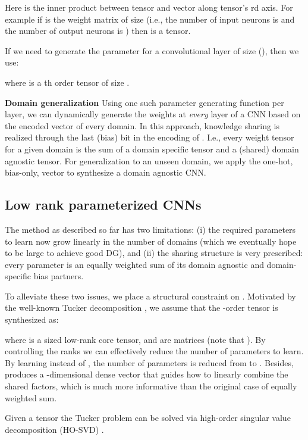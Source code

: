 \documentclass[10pt,twocolumn,letterpaper]{article}
\begin{document}
\noindent Here  is the inner product between tensor and vector along tensor's rd axis. For example if  is the weight matrix of size  (i.e., the number of input neurons is  and the number of output neurons is ) then  is a  tensor.

If we need to generate the parameter for a convolutional layer of size  (), then we use:

\noindent where  is a th order tensor of size .

\vspace{0.1cm}\noindent\textbf{Domain generalization}\quad
Using one such parameter generating function per layer, we can dynamically generate the weights at \emph{every} layer of a CNN based on the encoded vector of every domain. In this approach, knowledge sharing is realized through the last (bias) bit in the encoding of . I.e., every weight tensor for a given domain is the sum of a domain specific tensor and a (shared) domain agnostic tensor. For generalization to an unseen domain, we apply the one-hot, bias-only, vector  to synthesize a domain agnostic CNN. 

\subsection{Low rank parameterized CNNs}

The method as described so far has two limitations: (i) the required parameters to learn now grow linearly in the number of domains (which we eventually hope to be large to achieve good DG), and (ii) the sharing structure is very prescribed: every parameter is an equally weighted sum of its domain agnostic and domain-specific bias partners. 

To alleviate these two issues, we place a structural constraint on . Motivated by the well-known Tucker decomposition \cite{Tuck1966c}, we assume that the -order tensor  is synthesized as:

\noindent where  is a   sized low-rank core tensor, and  are  matrices (note that ). By controlling the ranks  we can effectively reduce the number of parameters to learn. By learning  instead of , the number of parameters is reduced from  to . Besides,  produces a -dimensional dense vector that guides how to linearly combine the shared factors, which is much more informative than the original case of equally weighted sum.

Given a tensor  the Tucker problem can be solved via high-order singular value decomposition (HO-SVD) \cite{Lathauwer2000}. 
\end{document}
